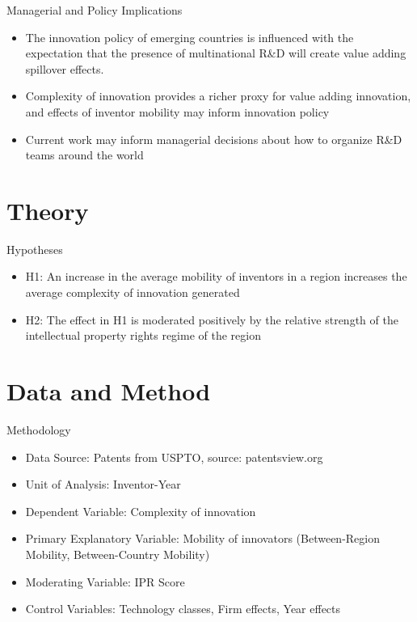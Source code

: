 \documentclass{beamer}
\begin{document}
\begin{frame}{Managerial and Policy Implications}{}
\begin{itemize}
\item{The innovation policy of emerging countries is influenced with the expectation that the presence of multinational R\&D will create value adding spillover effects.}
\item{Complexity of innovation provides a richer proxy for value adding innovation, and effects of inventor mobility may inform innovation policy}
\item{Current work may inform managerial decisions about how to organize R\&D teams around the world}
\end{itemize}
\end{frame}

\section{Theory}
\begin{frame}{Hypotheses}{}
\begin{itemize}
\item{H1: An increase in the average mobility of inventors in a region increases the average complexity of  innovation generated}
\item{H2: The effect in H1 is moderated positively by the relative strength of the intellectual property rights regime of the region}
\end{itemize}
\end{frame}


\section{Data and Method}
\begin{frame}{Methodology}{}
\begin{itemize}
\item{Data Source: Patents from USPTO, source: patentsview.org}
\item{Unit of Analysis: Inventor-Year}
\item{Dependent Variable: Complexity of innovation}
\item{Primary Explanatory Variable: Mobility of innovators (Between-Region Mobility, Between-Country Mobility)}
\item{Moderating Variable: IPR Score }
\item{Control Variables: Technology classes, Firm effects, Year effects}
\end{itemize}
\end{frame}
\end{document}
